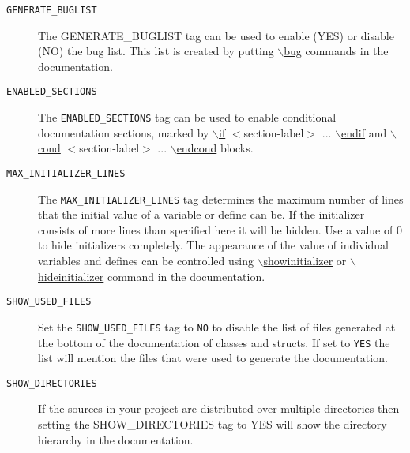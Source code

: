 \begin{description}
\label{config_cfg_generate_buglist}
\hypertarget{config_cfg_generate_buglist}{}
 \item[{\tt GENERATE\_\-BUGLIST} ] The GENERATE\_\-BUGLIST tag can be used to enable (YES) or disable (NO) the bug list. This list is created by putting \hyperlink{commands_cmdbug}{$\backslash$bug} commands in the documentation.

\label{config_cfg_enabled_sections}
\hypertarget{config_cfg_enabled_sections}{}
 \item[{\tt ENABLED\_\-SECTIONS} ] The {\tt ENABLED\_\-SECTIONS} tag can be used to enable conditional documentation sections, marked by \hyperlink{commands_cmdif}{$\backslash$if} $<$section-label$>$ ... \hyperlink{commands_cmdendif}{$\backslash$endif} and \hyperlink{commands_cmdcond}{$\backslash$cond} $<$section-label$>$ ... \hyperlink{commands_cmdendcond}{$\backslash$endcond} blocks.

\label{config_cfg_max_initializer_lines}
\hypertarget{config_cfg_max_initializer_lines}{}
 \item[{\tt MAX\_\-INITIALIZER\_\-LINES} ] The {\tt MAX\_\-INITIALIZER\_\-LINES} tag determines the maximum number of lines that the initial value of a variable or define can be. If the initializer consists of more lines than specified here it will be hidden. Use a value of 0 to hide initializers completely. The appearance of the value of individual variables and defines can be controlled using \hyperlink{commands_cmdshowinitializer}{$\backslash$showinitializer} or \hyperlink{commands_cmdhideinitializer}{$\backslash$hideinitializer} command in the documentation.

\label{config_cfg_show_used_files}
\hypertarget{config_cfg_show_used_files}{}
 \item[{\tt SHOW\_\-USED\_\-FILES} ] Set the {\tt SHOW\_\-USED\_\-FILES} tag to {\tt NO} to disable the list of files generated at the bottom of the documentation of classes and structs. If set to {\tt YES} the list will mention the files that were used to generate the documentation.

\label{config_cfg_show_dirs}
\hypertarget{config_cfg_show_dirs}{}
 \item[{\tt SHOW\_\-DIRECTORIES} ] If the sources in your project are distributed over multiple directories then setting the SHOW\_\-DIRECTORIES tag to YES will show the directory hierarchy in the documentation.

\end{description}
